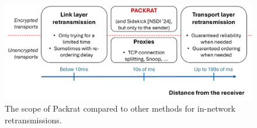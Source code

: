 \begin{figure}[t]
    \centering
    \includegraphics[width=0.9\linewidth]{packrat/figures/packrat-scope.pdf}
    \caption{The scope of Packrat compared to other methods for in-network retransmissions.}
    \label{fig:packrat:packrat-scope}
\end{figure}